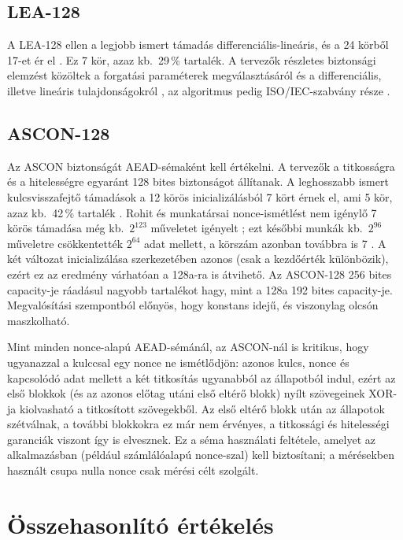 \documentclass[a4paper,12pt]{report}
\theoremstyle{definition}
\theoremstyle{remark}
\begin{document}
\subsection{LEA-128}

A LEA-128 ellen a legjobb ismert támadás differenciális-lineáris, és a 24 körből 17-et ér el \cite{Chen2023}. Ez 7 kör, azaz kb.\ 29\,\% tartalék. A tervezők részletes biztonsági elemzést közöltek a forgatási paraméterek megválasztásáról és a differenciális, illetve lineáris tulajdonságokról \cite{Hong2013}, az algoritmus pedig ISO/IEC-szabvány része \cite{ISO29192}.

\subsection{ASCON-128}

Az ASCON biztonságát AEAD-sémaként kell értékelni. A tervezők a titkosságra és a hitelességre egyaránt 128 bites biztonságot állítanak. A leghosszabb ismert kulcsvisszafejtő támadások a 12 körös inicializálásból 7 kört érnek el, ami 5 kör, azaz kb.\ 42\,\% tartalék \cite{Dobraunig2021,Rohit2021}. Rohit és munkatársai nonce-ismétlést nem igénylő 7 körös támadása még kb.\ $2^{123}$ műveletet igényelt \cite{Rohit2021}; ezt későbbi munkák kb.\ $2^{96}$ műveletre csökkentették $2^{64}$ adat mellett, a körszám azonban továbbra is 7 \cite{Peng2025}. A két változat inicializálása szerkezetében azonos (csak a kezdőérték különbözik), ezért ez az eredmény várhatóan a 128a-ra is átvihető. Az ASCON-128 256 bites capacity-je ráadásul nagyobb tartalékot hagy, mint a 128a 192 bites capacity-je. Megvalósítási szempontból előnyös, hogy konstans idejű, és viszonylag olcsón maszkolható.

Mint minden nonce-alapú AEAD-sémánál, az ASCON-nál is kritikus, hogy ugyanazzal a kulccsal egy nonce ne ismétlődjön: azonos kulcs, nonce és kapcsolódó adat mellett a két titkosítás ugyanabból az állapotból indul, ezért az első blokkok (és az azonos előtag utáni első eltérő blokk) nyílt szövegeinek XOR-ja kiolvasható a titkosított szövegekből. Az első eltérő blokk után az állapotok szétválnak, a további blokkokra ez már nem érvényes, a titkossági és hitelességi garanciák viszont így is elvesznek. Ez a séma használati feltétele, amelyet az alkalmazásban (például számlálóalapú nonce-szal) kell biztosítani; a mérésekben használt csupa nulla nonce csak mérési célt szolgált.

\section{Összehasonlító értékelés}\label{sec:security_compare}
\end{document}
